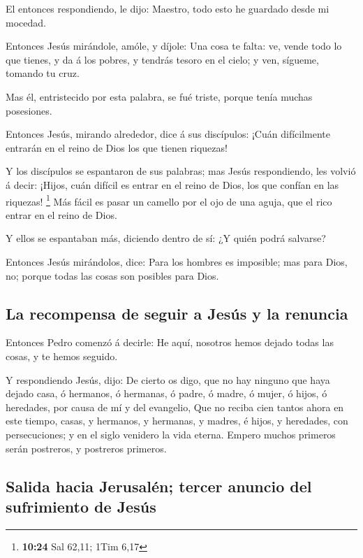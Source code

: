  El entonces respondiendo, le dijo: Maestro, todo esto he
guardado desde mi mocedad.

 Entonces Jesús mirándole, amóle, y díjole: Una cosa te
falta: ve, vende todo lo que tienes, y da á los pobres, y tendrás tesoro
en el cielo; y ven, sígueme, tomando tu cruz.

 Mas él, entristecido por esta palabra, se fué triste,
porque tenía muchas posesiones.

 Entonces Jesús, mirando alrededor, dice á sus discípulos:
¡Cuán difícilmente entrarán en el reino de Dios los que tienen riquezas!

 Y los discípulos se espantaron de sus palabras; mas Jesús
respondiendo, les volvió á decir: ¡Hijos, cuán difícil es entrar en el
reino de Dios, los que confían en las riquezas! \footnote{\textbf{10:24}
  Sal 62,11; 1Tim 6,17}  Más fácil es pasar un camello por
el ojo de una aguja, que el rico entrar en el reino de Dios.

 Y ellos se espantaban más, diciendo dentro de sí: ¿Y quién
podrá salvarse?

 Entonces Jesús mirándolos, dice: Para los hombres es
imposible; mas para Dios, no; porque todas las cosas son posibles para
Dios.

\hypertarget{la-recompensa-de-seguir-a-jesuxfas-y-la-renuncia}{%
\subsection{La recompensa de seguir a Jesús y la
renuncia}\label{la-recompensa-de-seguir-a-jesuxfas-y-la-renuncia}}

 Entonces Pedro comenzó á decirle: He aquí, nosotros hemos
dejado todas las cosas, y te hemos seguido.

 Y respondiendo Jesús, dijo: De cierto os digo, que no hay
ninguno que haya dejado casa, ó hermanos, ó hermanas, ó padre, ó madre,
ó mujer, ó hijos, ó heredades, por causa de mí y del evangelio,
 Que no reciba cien tantos ahora en este tiempo, casas, y
hermanos, y hermanas, y madres, é hijos, y heredades, con persecuciones;
y en el siglo venidero la vida eterna.  Empero muchos
primeros serán postreros, y postreros primeros.

\hypertarget{salida-hacia-jerusaluxe9n-tercer-anuncio-del-sufrimiento-de-jesuxfas}{%
\subsection{Salida hacia Jerusalén; tercer anuncio del sufrimiento de
Jesús}\label{salida-hacia-jerusaluxe9n-tercer-anuncio-del-sufrimiento-de-jesuxfas}}

